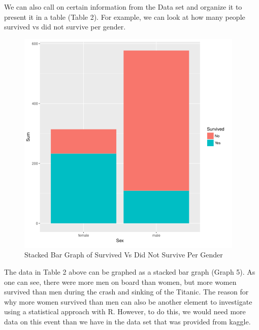 \documentclass[sigconf]{acmart}
\begin{document}
We can also call on certain information from the Data set and organize it to present it in a table (Table 2). For example, we can look at how many people survived vs did not survive per gender.

\begin{figure}[htb]
  \centering
  \includegraphics[width=1.0\columnwidth]{paper2/Graph 5.png}
  \caption{Stacked Bar Graph of Survived Vs Did Not Survive Per Gender
  \cite{Tibenkana and Driscoll, Data Set from Kaggle}}
  \label{fig:Graph 5} 
\end{figure}

The data in Table 2 above can be graphed as a stacked bar graph (Graph 5). As one can see, there were more men on board than women, but more women survived than men during the crash and sinking of the Titanic. The reason for why more women survived than men can also be another element to investigate using a statistical approach with R. However, to do this, we would need more data on this event than we have in the data set that was provided from kaggle. 
\end{document}
